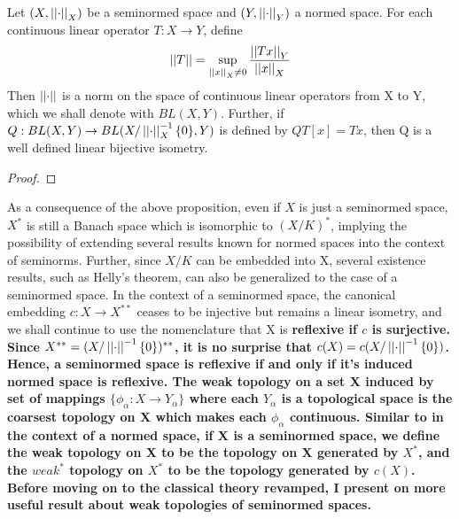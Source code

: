 \begin{prop}
    \label{prop:seminormlinearoperators}
    Let $(X,\left|\left| \cdot \right|\right|_X)$ be a seminormed space and $(Y,\left|\left| \cdot \right|\right|_Y)$ a normed space.
    For each continuous linear operator $T:X \to Y$, define 
    \begin{equation}
        \left|\left| T \right|\right| = \sup\limits_{\left|\left| x \right|\right|_X \neq 0} \frac{\left|\left| Tx \right|\right|_Y}{\left|\left| x \right|\right|_X}
    \end{equation}
    Then $\left|\left| \cdot \right|\right|$ is a norm on the space of continuous linear operators from X to Y, which we shall denote with $BL(X,Y)$. 
    Further, if $Q:BL(X,Y) \to BL(X/\left|\left| \cdot \right|\right|_X^{-1}\{0\},Y)$ is defined by $QT[x]=Tx$, then Q is a well defined linear bijective isometry. 
    \begin{proof}
    \end{proof} 
\end{prop} 
As a consequence of the above proposition, even if $X$ is just a seminormed space, $X^*$ is still a Banach space which is isomorphic to $(X/K)^*$, implying the possibility of extending several results known for normed spaces into the context of seminorms. Further, since $X/K$ can be embedded into X, several existence results, such as Helly's theorem, can also be generalized to the case of a seminormed space. In the context of a seminormed space, the canonical embedding $c:X \to X^{**}$ ceases to be injective but remains a linear isometry, and we shall continue to use the nomenclature that X is \bf reflexive \rm if $c$ is surjective. Since $X^{**}=(X/\left|\left| \cdot \right|\right|^{-1}\{0\})^{**}$, it is no surprise that $c(X)=c(X/\left|\left| \cdot \right|\right|^{-1}\{0\})$. Hence, a seminormed space is reflexive if and only if it's induced normed space is reflexive.  The weak topology on a set X induced by set of mappings $\{\phi_\alpha:X \to Y_\alpha\}$ where each $Y_\alpha$ is a topological space is the coarsest topology on X which makes each $\phi_\alpha$ continuous. Similar to in the context of a normed space, if X is a seminormed space, we define the weak topology on X to be the topology on X generated by $X^*$, and the $weak^*$ topology on $X^*$ to be the topology generated by $c(X)$.
Before moving on to the classical theory revamped, I present on more useful result about weak topologies of seminormed spaces. 
